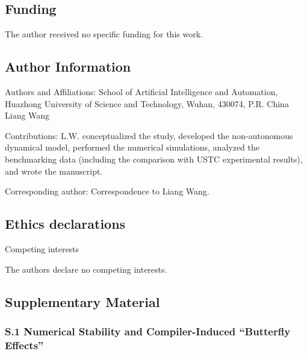 \hypertarget{funding}{%
\subsection{\texorpdfstring{\textbf{Funding}}{Funding}}\label{funding}}

The author received no specific funding for this work.

\hypertarget{author-information}{%
\subsection{\texorpdfstring{\textbf{Author
Information}}{Author Information}}\label{author-information}}

Authors and Affiliations: School of Artificial Intelligence and
Automation, Huazhong University of Science and Technology, Wuhan,
430074, P.R. China Liang Wang

Contributions: L.W. conceptualized the study, developed the
non-autonomous dynamical model, performed the numerical simulations,
analyzed the benchmarking data (including the comparison with USTC
experimental results), and wrote the manuscript.

Corresponding author: Correspondence to Liang Wang.

\hypertarget{ethics-declarations}{%
\subsection{\texorpdfstring{\textbf{Ethics
declarations}}{Ethics declarations}}\label{ethics-declarations}}

Competing interests

The authors declare no competing interests.

\hypertarget{supplementary-material}{%
\subsection{\texorpdfstring{\textbf{Supplementary
Material}}{Supplementary Material}}\label{supplementary-material}}

\hypertarget{s.1-numerical-stability-and-compiler-induced-butterfly-effects}{%
\subsubsection{\texorpdfstring{\textbf{S.1 Numerical Stability and
Compiler-Induced ``Butterfly
Effects''}}{S.1 Numerical Stability and Compiler-Induced ``Butterfly Effects''}}\label{s.1-numerical-stability-and-compiler-induced-butterfly-effects}}

